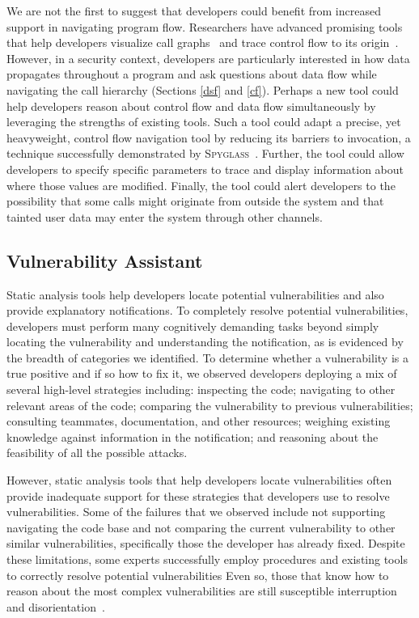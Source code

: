 \documentclass{acm_proc_article-sp}
\begin{document}
We are not the first to suggest that developers could benefit from increased support in navigating program flow. 
Researchers have advanced promising tools that help developers visualize call graphs~\cite{latoza2011visualizing} and trace control flow to its origin~\cite{barnett2014getMeHere}.
However, in a security context, developers are particularly interested in how data propagates throughout a program and ask questions about data flow while navigating the call hierarchy (Sections \ref{dsf} and \ref{cf}).
Perhaps a new tool could help developers reason about control flow and data flow simultaneously by leveraging the strengths of existing tools.
Such a tool could adapt a precise, yet heavyweight, control flow navigation tool by reducing its barriers to invocation, a technique successfully demonstrated by \textsc{Spyglass}~\cite{viriyakattiyaporn2010spyglass}.
Further, the tool could allow developers to specify specific parameters to trace and display information about where those values are modified.
Finally, the tool could alert developers to the possibility that some calls might originate from outside the system and that tainted user data may enter the system through other channels.

\subsection{Vulnerability Assistant}
Static analysis tools help developers locate potential vulnerabilities and also provide explanatory notifications.
To completely resolve potential vulnerabilities, developers must perform many cognitively demanding tasks beyond simply locating the vulnerability and understanding the notification, as is evidenced by the breadth of categories we identified. 
To determine whether a vulnerability is a true positive and if so how to fix it, we observed developers deploying a mix of several high-level strategies including: inspecting the code;
navigating to other relevant areas of the code; 
comparing the vulnerability to previous vulnerabilities; 
consulting teammates, documentation, and other resources; 
weighing existing knowledge against information in the notification; 
and reasoning about the feasibility of all the possible attacks. 

However, static analysis tools that help developers locate vulnerabilities often provide inadequate support for these strategies that developers use to resolve vulnerabilities. 
Some of the failures that we observed include not supporting navigating the code base and not comparing the current vulnerability to other similar vulnerabilities, specifically those the developer has already fixed. 
Despite these limitations, some experts successfully employ procedures and existing tools to correctly resolve potential vulnerabilities
Even so, those that know how to reason about the most complex vulnerabilities are still susceptible interruption~\cite{parnin2012programmer} and disorientation~\cite{deAlwis2006disorient}.
\end{document}
